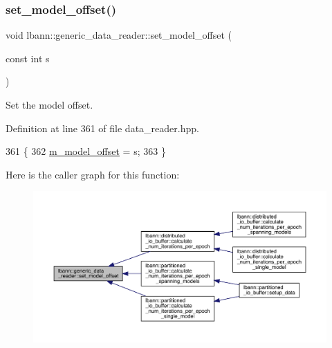 \subsubsection{\texorpdfstring{set\+\_\+model\+\_\+offset()}{set\_model\_offset()}}
{\footnotesize\ttfamily void lbann\+::generic\+\_\+data\+\_\+reader\+::set\+\_\+model\+\_\+offset (\begin{DoxyParamCaption}\item[{const int}]{s }\end{DoxyParamCaption})\hspace{0.3cm}{\ttfamily [inline]}}



Set the model offset. 



Definition at line 361 of file data\+\_\+reader.\+hpp.


\begin{DoxyCode}
361                                      \{
362     \hyperlink{classlbann_1_1generic__data__reader_a5d9a0efd1ebe43a74911c35ffe84edc9}{m\_model\_offset} = s;
363   \}
\end{DoxyCode}
Here is the caller graph for this function\+:\nopagebreak
\begin{figure}[H]
\begin{center}
\leavevmode
\includegraphics[width=350pt]{classlbann_1_1generic__data__reader_ab20e835e0e0565717e0fd74da09d4890_icgraph}
\end{center}
\end{figure}
\mbox{\label{classlbann_1_1generic__data__reader_a91573d9599b503a6bdf2939e69659e8b}} 
